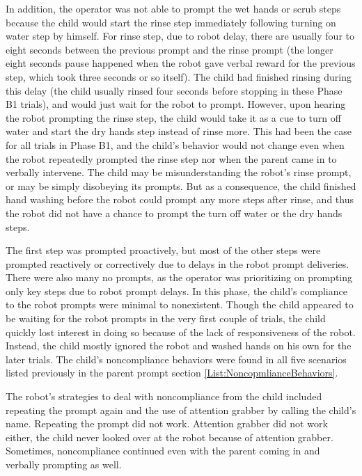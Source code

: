 In addition, the operator was not able to prompt the wet hands or scrub steps because the child would start the rinse step immediately following turning on water step by himself.  For rinse step, due to robot delay, there are usually four to eight seconds between the previous prompt and the rinse prompt (the longer eight seconds pause happened when the robot gave verbal reward for the previous step, which took three seconds or so itself).  The child had finished rinsing during this delay (the child usually rinsed four seconds before stopping in these Phase B1 trials), and would just wait for the robot to prompt.  However, upon hearing the robot prompting the rinse step, the child would take it as a cue to turn off water and start the dry hands step instead of rinse more.  This had been the case for all trials in Phase B1, and the child's behavior would not change even when the robot repeatedly prompted the rinse step nor when the parent came in to verbally intervene.  The child may be misunderstanding the robot's rinse prompt, or may be simply disobeying its prompts.  But as a consequence, the child finished hand washing before the robot could prompt any more steps after rinse, and thus the robot did not have a chance to prompt the turn off water or the dry hands steps.

The first step was prompted proactively, but most of the other steps were prompted reactively or correctively due to delays in the robot prompt deliveries.  There were also many no prompts, as the operator was prioritizing on prompting only key steps due to robot prompt delays.  In this phase, the child's compliance to the robot prompts were minimal to nonexistent.  Though the child appeared to be waiting for the robot prompts in the very first couple of trials, the child quickly lost interest in doing so because of the lack of responsiveness of the robot.  Instead, the child mostly ignored the robot and washed hands on his own for the later trials.  The child's noncompliance behaviors were found in all five scenarios listed previously in the parent prompt section \ref{List:NoncopmlianceBehaviors}.

The robot's strategies to deal with noncompliance from the child included repeating the prompt again and the use of attention grabber by calling the child's name.  Repeating the prompt did not work.  Attention grabber did not work either, the child never looked over at the robot because of attention grabber.  Sometimes, noncompliance continued even with the parent coming in and verbally prompting as well.

